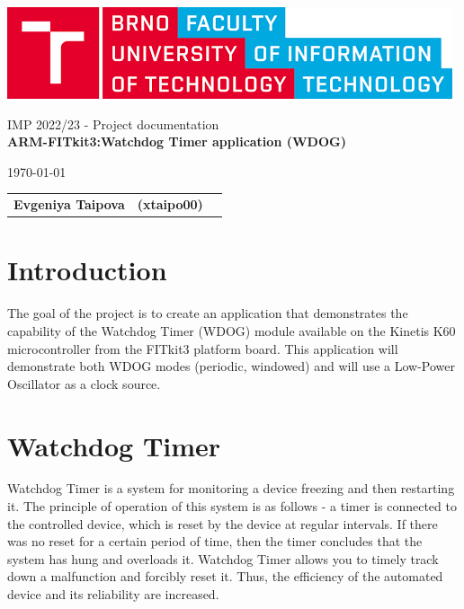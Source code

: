 \documentclass[a4paper, 12pt]{article}
\begin{document}
	\begin{titlepage}
		\begin{center}
			\includegraphics[width=0.77\linewidth]{logo.png} \\


			\Huge{IMP 2022/23 - Project documentation} \\
			\LARGE{\textbf{ARM-FITkit3:Watchdog Timer application  (WDOG)}} \\
		\end{center}

		\begin{minipage}{0.4 \textwidth}
			{\Large \today}
		\end{minipage}
		\hfill
		\begin{minipage}[r]{0.6 \textwidth}
			\Large
			\begin{tabular}{l l l}
				\textbf{Evgeniya Taipova} & \textbf{(xtaipo00)}\\
			
			\end{tabular}
		\end{minipage}
	\end{titlepage}


	
	\tableofcontents
	\clearpage



	\section{Introduction}
 The goal of the project is to create an application that demonstrates the capability of the Watchdog Timer (WDOG) module available on the Kinetis K60 microcontroller from the FITkit3 platform board. This application will demonstrate both WDOG modes (periodic, windowed) and will use a Low-Power Oscillator as a clock source.
 \section{Watchdog Timer}
Watchdog Timer is a system for monitoring a device freezing and then restarting it. The principle of operation of this system is as follows - a timer is connected to the controlled device, which is reset by the device at regular intervals. If there was no reset for a certain period of time, then the timer concludes that the system has hung and overloads it.
Watchdog Timer allows you to timely track down a malfunction and forcibly reset it. Thus, the efficiency of the automated device and its reliability are increased.
\end{document}
